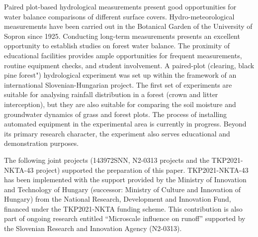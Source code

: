 Paired plot-based hydrological measurements present good opportunities for water balance comparisons of different surface covers. Hydro-meteorological measurements have been carried out in the Botanical Garden of the University of Sopron since 1925. Conducting long-term measurements presents an excellent opportunity to establish studies on forest water balance. The proximity of educational facilities provides ample opportunities for frequent measurements, routine equipment checks, and student involvement. A paired-plot (clearing, black pine forest") hydrological experiment was set up within the framework of an international Slovenian-Hungarian project. The first set of experiments are suitable for analysing rainfall distribution in a forest (crown and litter interception), but they are also suitable for comparing the soil moisture and groundwater dynamics of grass and forest plots. The process of installing automated equipment in the experimental area is currently in progress. Beyond its primary research character, the experiment also serves educational and demonstration purposes.

The following joint projects (143972SNN, N2-0313 projects and the TKP2021-NKTA-43 project) supported the preparation of this paper. TKP2021-NKTA-43 has been implemented with the support provided by the Ministry of Innovation and Technology of Hungary (successor: Ministry of Culture and Innovation of Hungary) from the National Research, Development and Innovation Fund, financed under the TKP2021-NKTA funding scheme. This contribution is also part of ongoing research entitled “Microscale influence on runoff” supported by the Slovenian Research and Innovation Agency (N2-0313).



\newpage{}
{}
\begin{flushleft}






\end{flushleft}

